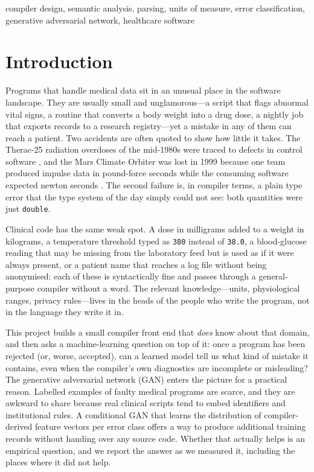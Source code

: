 \documentclass[conference]{IEEEtran}
\newcommand{\code}[1]{\texttt{#1}}
\begin{document}
\begin{IEEEkeywords}
compiler design, semantic analysis, parsing, units of measure, error classification, generative adversarial network,
healthcare software
\end{IEEEkeywords}

\section{Introduction}\label{sec:intro}

Programs that handle medical data sit in an unusual place in the software landscape.
They are usually small and unglamorous---a script that flags abnormal vital signs, a routine that converts a
body weight into a drug dose, a nightly job that exports records to a research registry---yet a mistake in any
of them can reach a patient. Two accidents are often quoted to show how little it takes. The Therac-25 radiation
overdoses of the mid-1980s were traced to defects in control software \cite{leveson1993}, and the Mars Climate
Orbiter was lost in 1999 because one team produced impulse data in pound-force seconds while the consuming
software expected newton seconds \cite{mco1999}. The second failure is, in compiler terms, a plain type error
that the type system of the day simply could not see: both quantities were just \code{double}.

Clinical code has the same weak spot. A dose in milligrams added to a weight in kilograms, a temperature
threshold typed as \code{380} instead of \code{38.0}, a blood-glucose reading that may be missing from the
laboratory feed but is used as if it were always present, or a patient name that reaches a log file without
being anonymised: each of these is syntactically fine and passes through a general-purpose compiler without a
word. The relevant knowledge---units, physiological ranges, privacy rules---lives in the heads of the people who
write the program, not in the language they write it in.

This project builds a small compiler front end that \emph{does} know about that domain, and then asks a
machine-learning question on top of it: once a program has been rejected (or, worse, accepted), can a learned
model tell us what kind of mistake it contains, even when the compiler's own diagnostics are incomplete or
misleading? The generative adversarial network (GAN) enters the picture for a practical reason. Labelled
examples of faulty medical programs are scarce, and they are awkward to share because real clinical scripts tend
to embed identifiers and institutional rules. A conditional GAN that learns the distribution of compiler-derived
feature vectors per error class offers a way to produce additional training records without handing over any
source code. Whether that actually helps is an empirical question, and we report the answer as we measured it,
including the places where it did not help.
\end{document}
